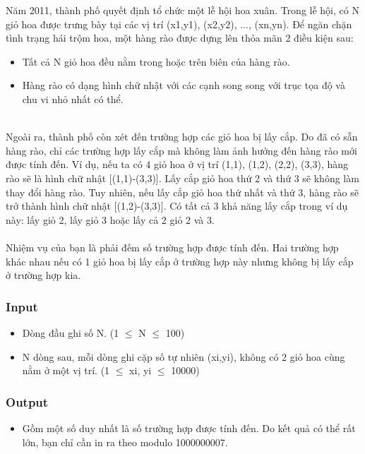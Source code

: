 



   Năm 2011, thành phố quyết định tổ chức một lễ hội hoa xuân. Trong lễ hội, có N giỏ hoa được trưng bày tại các vị trí (x1,y1), (x2,y2), ..., (xn,yn). Để ngăn chặn tình trạng hái trộm hoa, một hàng rào được dựng lên thỏa mãn 2 điều kiện sau:  
\begin{itemize}
	\item     Tất cả N giỏ hoa đều nằm trong hoặc trên biên của hàng rào.   
\end{itemize}
\begin{itemize}
	\item     Hàng rào có dạng hình chữ nhật với các cạnh song song với trục tọa độ và chu vi nhỏ nhất có thể.   
\end{itemize}


\\   Ngoài ra, thành phố còn xét đến trường hợp các giỏ hoa bị lấy cắp. Do đã có sẵn hàng rào, chỉ các trường hợp lấy cắp mà không làm ảnh hưởng đến hàng rào mới được tính đến. Ví dụ, nếu ta có 4 giỏ hoa ở vị trí (1,1), (1,2), (2,2), (3,3), hàng rào sẽ là hình chữ nhật [(1,1)-(3,3)]. Lấy cắp giỏ hoa thứ 2 và thứ 3 sẽ không làm thay đổi hàng rào. Tuy nhiên, nếu lấy cắp giỏ hoa thứ nhất và thứ 3, hàng rào sẽ trở thành hình chữ nhật [(1,2)-(3,3)]. Có tất cả 3 khả năng lấy cắp trong ví dụ này: lấy giỏ 2, lấy giỏ 3 hoặc lấy cả 2 giỏ 2 và 3.   
\\
\\   Nhiệm vụ của bạn là phải đếm số trường hợp được tính đến. Hai trường hợp khác nhau nếu có 1 giỏ hoa bị lấy cắp ở trường hợp này nhưng không bị lấy cắp ở trường hợp kia.  

\subsubsection{   Input  }
\begin{itemize}
	\item     Dòng đầu ghi số N. (1  $\le$  N  $\le$  100)   
\end{itemize}
\begin{itemize}
	\item     N dòng sau, mỗi dòng ghi cặp số tự nhiên (xi,yi), không có 2 giỏ hoa cùng nằm ở một vị trí. (1  $\le$  xi, yi  $\le$  10000)   
\end{itemize}

\subsubsection{   Output  }
\begin{itemize}
	\item     Gồm một số duy nhất là số trường hợp được tính đến. Do kết quả có thể rất lớn, bạn chỉ cần in ra theo modulo 1000000007.   
\end{itemize}

